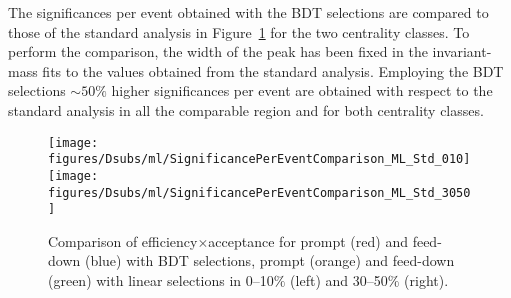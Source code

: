 The significances per event obtained with the BDT selections are compared to those of the standard analysis in Figure~\ref{fig:signif_comp} 
for the two centrality classes. To perform the comparison, the width of the \Dsubs{} peak has been fixed in the invariant-mass fits to the 
values obtained from the standard analysis. Employing the BDT selections \(\sim50\%\) higher significances per event are obtained with respect to the standard 
analysis in all the comparable \pt{} region and for both centrality classes.
\begin{figure}[htbp]
  \begin{center}
   \texttt{[image: figures/Dsubs/ml/SignificancePerEventComparison\_ML\_Std\_010]}
   \texttt{[image: figures/Dsubs/ml/SignificancePerEventComparison\_ML\_Std\_3050]} 
  \caption{Comparison of efficiency$\times$acceptance for prompt (red) and feed-down (blue) \Dsubs{} with BDT selections, 
           prompt (orange) and feed-down (green) \Dsubs{} with linear selections in 0--10$\%$ (left) and 30--50$\%$ (right).}
  \label{fig:signif_comp}
  \end{center}
\end{figure}

